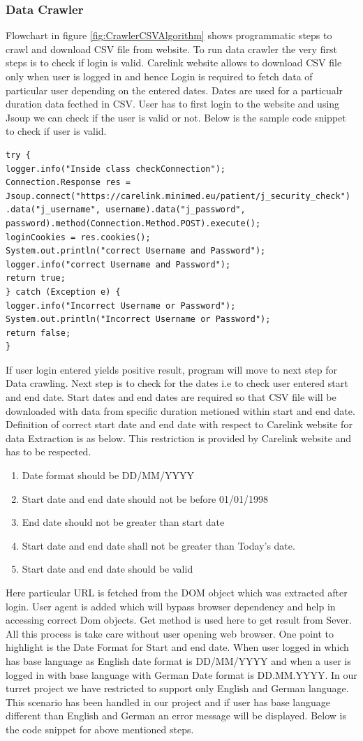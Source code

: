 \documentclass[article,type=msc,colorback,accentcolor=tud9c,twoside,11pt]{tudthesis}
\begin{document}
 
\subsubsection{Data Crawler}
\label{subsec:DataCrawler}
 Flowchart in figure \ref{fig:CrawlerCSVAlgorithm} shows programmatic steps to crawl and download CSV file from website. To run data crawler the very first steps is to check if login is valid. Carelink website allows to download CSV file only when user is logged in and hence Login is required to fetch data of particular user depending on the entered dates. Dates are used for a particualr duration data fecthed in CSV. User has to first login to the website and using Jsoup we can check if the user is valid or not. Below is the sample code snippet to check if user is valid.
\begin{lstlisting}
try {
logger.info("Inside class checkConnection");
Connection.Response res = Jsoup.connect("https://carelink.minimed.eu/patient/j_security_check")
.data("j_username", username).data("j_password", password).method(Connection.Method.POST).execute();
loginCookies = res.cookies();
System.out.println("correct Username and Password");
logger.info("correct Username and Password");
return true;
} catch (Exception e) {
logger.info("Incorrect Username or Password");
System.out.println("Incorrect Username or Password");
return false;
}
\end{lstlisting}
If user login entered yields positive result, program will move to next step for Data crawling. Next step is to check for the dates i.e to check user entered start and end date. Start dates and end dates are required so that CSV file will be downloaded with data from specific duration metioned within start and end date. Definition of correct start date and end date with respect to Carelink website for data Extraction is as below. This restriction is provided by Carelink website and has to be respected.
\begin{enumerate}
\item Date format should be DD/MM/YYYY
\item Start date and end date should not be before 01/01/1998
\item End date should not be greater than start date
\item Start date and end date shall not be greater than Today's date.
\item Start date and end date should be valid
\end{enumerate}
Here particular URL is fetched from the DOM object which was extracted after login. User agent is added which will bypass browser dependency and help in accessing correct Dom objects. Get method is used here to get result from Sever. All this process is take care without user opening web browser. One point to highlight is the Date Format for Start and end date. When user logged in which has base language as English date format is DD/MM/YYYY and when a user is logged in with base language with German Date format is DD.MM.YYYY. In our turret project we have restricted to support only English and German language. This scenario has been handled in our project and if user has base language different than English and German an error message will be displayed. Below is the code snippet for above mentioned steps. 
\end{document}
